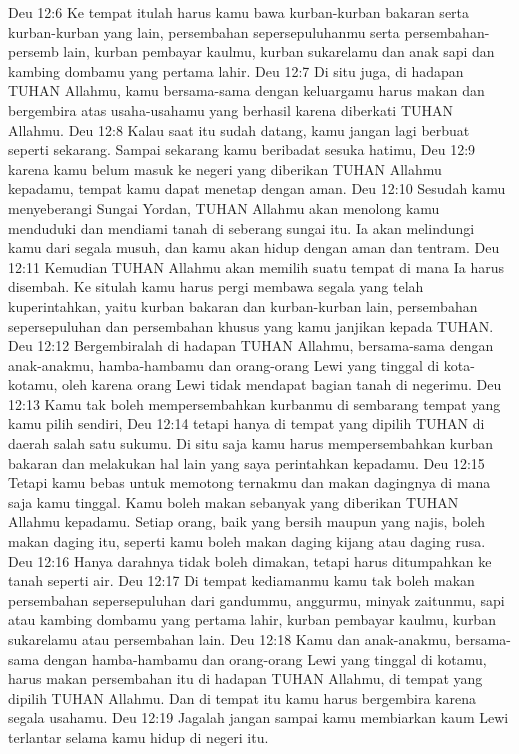 Deu 12:6  Ke tempat itulah harus kamu bawa kurban-kurban bakaran serta kurban-kurban yang lain, persembahan sepersepuluhanmu serta persembahan-persemb lain, kurban pembayar kaulmu, kurban sukarelamu dan anak sapi dan kambing dombamu yang pertama lahir.
Deu 12:7  Di situ juga, di hadapan TUHAN Allahmu, kamu bersama-sama dengan keluargamu harus makan dan bergembira atas usaha-usahamu yang berhasil karena diberkati TUHAN Allahmu.
Deu 12:8  Kalau saat itu sudah datang, kamu jangan lagi berbuat seperti sekarang. Sampai sekarang kamu beribadat sesuka hatimu,
Deu 12:9  karena kamu belum masuk ke negeri yang diberikan TUHAN Allahmu kepadamu, tempat kamu dapat menetap dengan aman.
Deu 12:10  Sesudah kamu menyeberangi Sungai Yordan, TUHAN Allahmu akan menolong kamu menduduki dan mendiami tanah di seberang sungai itu. Ia akan melindungi kamu dari segala musuh, dan kamu akan hidup dengan aman dan tentram.
Deu 12:11  Kemudian TUHAN Allahmu akan memilih suatu tempat di mana Ia harus disembah. Ke situlah kamu harus pergi membawa segala yang telah kuperintahkan, yaitu kurban bakaran dan kurban-kurban lain, persembahan sepersepuluhan dan persembahan khusus yang kamu janjikan kepada TUHAN.
Deu 12:12  Bergembiralah di hadapan TUHAN Allahmu, bersama-sama dengan anak-anakmu, hamba-hambamu dan orang-orang Lewi yang tinggal di kota-kotamu, oleh karena orang Lewi tidak mendapat bagian tanah di negerimu.
Deu 12:13  Kamu tak boleh mempersembahkan kurbanmu di sembarang tempat yang kamu pilih sendiri,
Deu 12:14  tetapi hanya di tempat yang dipilih TUHAN di daerah salah satu sukumu. Di situ saja kamu harus mempersembahkan kurban bakaran dan melakukan hal lain yang saya perintahkan kepadamu.
Deu 12:15  Tetapi kamu bebas untuk memotong ternakmu dan makan dagingnya di mana saja kamu tinggal. Kamu boleh makan sebanyak yang diberikan TUHAN Allahmu kepadamu. Setiap orang, baik yang bersih maupun yang najis, boleh makan daging itu, seperti kamu boleh makan daging kijang atau daging rusa.
Deu 12:16  Hanya darahnya tidak boleh dimakan, tetapi harus ditumpahkan ke tanah seperti air.
Deu 12:17  Di tempat kediamanmu kamu tak boleh makan persembahan sepersepuluhan dari gandummu, anggurmu, minyak zaitunmu, sapi atau kambing dombamu yang pertama lahir, kurban pembayar kaulmu, kurban sukarelamu atau persembahan lain.
Deu 12:18  Kamu dan anak-anakmu, bersama-sama dengan hamba-hambamu dan orang-orang Lewi yang tinggal di kotamu, harus makan persembahan itu di hadapan TUHAN Allahmu, di tempat yang dipilih TUHAN Allahmu. Dan di tempat itu kamu harus bergembira karena segala usahamu.
Deu 12:19  Jagalah jangan sampai kamu membiarkan kaum Lewi terlantar selama kamu hidup di negeri itu.
